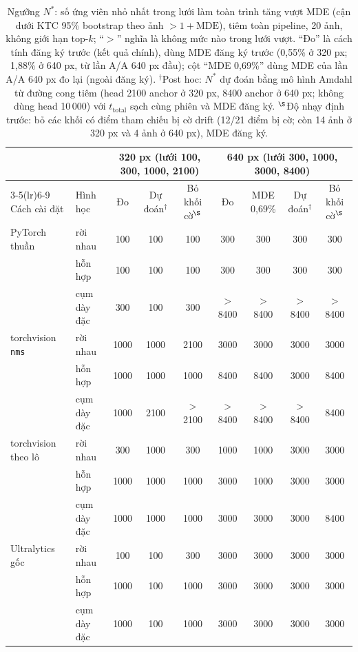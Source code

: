 \begin{table}[t]
\centering\small
\caption{Ngưỡng $N^{*}$: số ứng viên nhỏ nhất trong lưới làm toàn trình tăng vượt MDE (cận dưới KTC 95\% bootstrap theo ảnh $>1+\mathrm{MDE}$), tiêm toàn pipeline, 20 ảnh, không giới hạn top-$k$; ``$>$'' nghĩa là không mức nào trong lưới vượt. ``Đo'' là cách tính đăng ký trước (kết quả chính), dùng MDE đăng ký trước (0,55\% ở 320 px; 1,88\% ở 640 px, từ lần A/A 640 px đầu); cột ``MDE 0,69\%'' dùng MDE của lần A/A 640 px đo lại (ngoài đăng ký). $^{\dagger}$Post hoc: $N^{*}$ dự đoán bằng mô hình Amdahl từ đường cong tiêm (head 2100 anchor ở 320 px, 8400 anchor ở 640 px; không dùng head 10\,000) với $t_{\mathrm{total}}$ sạch cùng phiên và MDE đăng ký. $^{\S}$Độ nhạy định trước: bỏ các khối có điểm tham chiếu bị cờ drift (12/21 điểm bị cờ; còn 14 ảnh ở 320 px và 4 ảnh ở 640 px), MDE đăng ký.}
\label{tab:nstar}
\begin{tabular}{@{}llccccccc@{}}
\toprule
 & & \multicolumn{3}{c}{320 px (lưới 100, 300, 1000, 2100)} & \multicolumn{4}{c}{640 px (lưới 300, 1000, 3000, 8400)} \\
\cmidrule(lr){3-5}\cmidrule(lr){6-9}
Cách cài đặt & Hình học & Đo & Dự đoán$^{\dagger}$ & Bỏ khối cờ$^{\S}$ & Đo & MDE 0,69\% & Dự đoán$^{\dagger}$ & Bỏ khối cờ$^{\S}$ \\
\midrule
PyTorch thuần & rời nhau & 100 & 100 & 100 & 300 & 300 & 300 & 300 \\
 & hỗn hợp & 100 & 100 & 100 & 300 & 300 & 300 & 300 \\
 & cụm dày đặc & 300 & 100 & 300 & $>$8400 & $>$8400 & $>$8400 & $>$8400 \\
torchvision \texttt{nms} & rời nhau & 1000 & 1000 & 2100 & 3000 & 3000 & 3000 & 3000 \\
 & hỗn hợp & 1000 & 1000 & 1000 & 8400 & 8400 & 3000 & 8400 \\
 & cụm dày đặc & 1000 & 2100 & $>$2100 & $>$8400 & $>$8400 & $>$8400 & 8400 \\
torchvision theo lô & rời nhau & 300 & 1000 & 300 & 1000 & 1000 & 3000 & 3000 \\
 & hỗn hợp & 1000 & 1000 & 1000 & 3000 & 1000 & 3000 & 3000 \\
 & cụm dày đặc & 1000 & 1000 & 1000 & 3000 & 3000 & 3000 & 8400 \\
Ultralytics gốc & rời nhau & 100 & 100 & 300 & 3000 & 3000 & 3000 & 3000 \\
 & hỗn hợp & 1000 & 100 & 1000 & 3000 & 3000 & 3000 & 3000 \\
 & cụm dày đặc & 1000 & 100 & 1000 & 3000 & 3000 & 3000 & 3000 \\
\bottomrule
\end{tabular}
\end{table}
